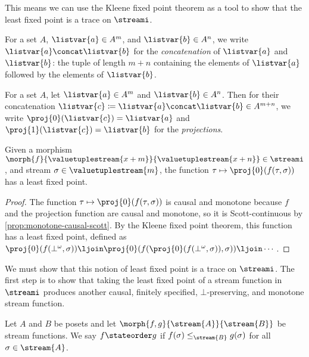 \documentclass{lmcs}
\begin{document}
This means we can use the Kleene fixed point theorem as a tool to show that the
least fixed point is a trace on \(\streami\).

\begin{nota}[Concatenation]
    For a set \(A\), \(\listvar{a} \in A^m\), and \(\listvar{b} \in A^n\), we
    write \(\listvar{a} \concat \listvar{b}\) for the \emph{concatenation}
    of \(\listvar{a}\) and \(\listvar{b}\): the tuple of length \(m+n\)
    containing the elements of \(\listvar{a}\) followed by the elements of
    \(\listvar{b}\).
\end{nota}

\begin{nota}[Projection]
    For a set \(A\), let \(\listvar{a} \in A^m\) and \(\listvar{b} \in A^n\).
    Then for their concatenation \(
    \listvar{c} \coloneqq \listvar{a} \concat \listvar{b} \in A^{m+n}\),
    we write \(\proj{0}(\listvar{c}) = \listvar{a}\) and
    \(\proj{1}(\listvar{c}) = \listvar{b}\) for the \emph{projections}.
\end{nota}

\begin{lem}\label{lem:lfp-stream-function}
    Given a morphism \(
    \morph{f}{\valuetuplestream{x+m}}{\valuetuplestream{x+n}}
    \in \streami
    \), and stream \(\sigma \in \valuetuplestream{m}\), the function \(
    \tau \mapsto \proj{0}\mleft(f(\tau,\sigma)\mright)
    \) has a least fixed point.
\end{lem}
\begin{proof}
    The function \(\tau \mapsto \proj{0}\mleft(f(\tau,\sigma)\mright)\) is
    causal and monotone because \(f\) and the projection function are
    causal and monotone, so it is Scott-continuous by
    \autoref{prop:monotone-causal-scott}.
    By the Kleene fixed point theorem, this function has a least fixed point,
    defined as \(
    \proj{0}\mleft(f(\bot^\omega, \sigma)\mright) \ljoin
    \proj{0}\mleft(f(\proj{0}\mleft(f(\bot^\omega, \sigma)\mright), \sigma)\mright) \ljoin
    \cdots
    \).
\end{proof}

We must show that this notion of least fixed point is a trace on \(\streami\).
The first step is to show that taking the least fixed point of a stream function
in \(\streami\) produces another causal, finitely specified,
\(\bot\)-preserving, and monotone stream function.

\begin{defi}\label{def:state-order}
    Let \(A\) and \(B\) be posets and let
    \(\morph{f, g}{\stream{A}}{\stream{B}}\) be stream functions.
    We say \(f \stateorder g\) if \(f(\sigma) \leq_{\stream{B}} g(\sigma)\)
    for all \(\sigma \in \stream{A}\).
\end{defi}
\end{document}
